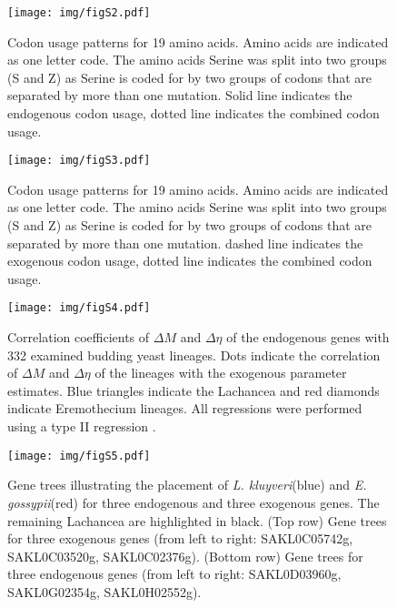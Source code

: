 \documentclass[doublespacing,linenumbers]{bmcart-modified}
\newcommand{\kluyveri}{\textit{L. kluyveri}\xspace}
\newcommand{\gossypii}{\textit{E. gossypii}\xspace}
\newcommand{\DM}{\ensuremath{{\Delta M}}\xspace}
\newcommand{\DE}{\ensuremath{{\Delta \eta}}\xspace}
\begin{document}
\begin{backmatter}
\begin{figure}
     \centering
	\texttt{[image: img/figS2.pdf]}%
	\caption{Codon usage patterns for 19 amino acids. Amino acids are indicated as one letter code. 
	The amino acids Serine was split into two groups (S and Z) as Serine is coded for by two groups of codons that are separated by more than one mutation.
	Solid line indicates the endogenous codon usage, dotted line indicates the combined codon usage.}
	\label{fig:cub_full_main}
\end{figure}
\null
\vfill
\begin{figure}
     \centering
	\texttt{[image: img/figS3.pdf]}%
	\caption{Codon usage patterns for 19 amino acids. Amino acids are indicated as one letter code. 
	The amino acids Serine was split into two groups (S and Z) as Serine is coded for by two groups of codons that are separated by more than one mutation.
	dashed line indicates the exogenous codon usage, dotted line indicates the combined codon usage.}
	\label{fig:cub_full_cleft}
\end{figure}

\null
\vfill
\begin{figure}
     \centering
	\texttt{[image: img/figS4.pdf]}%
	\caption{Correlation coefficients of \DM and \DE of the endogenous genes with 332 examined budding yeast lineages. 
	Dots indicate the correlation of \DM and \DE of the lineages with the exogenous parameter estimates.
	Blue triangles indicate the Lachancea and red diamonds indicate Eremothecium lineages.
	All regressions were performed using a type II regression \citep{SokalAndRohlf1981}.}
	\label{fig:csp_endo_comp}
\end{figure}
\null
\vfill

\null
\vfill
\begin{figure}
     \centering
	\texttt{[image: img/figS5.pdf]}%
	\caption{Gene trees illustrating the placement of \kluyveri (blue) and \gossypii (red) for three endogenous and three exogenous genes. 
	The remaining Lachancea are highlighted in black. 
	(Top row)  Gene trees for three exogenous genes (from left to right: SAKL0C05742g, SAKL0C03520g, SAKL0C02376g).
	(Bottom row) Gene trees for three endogenous genes (from left to right: SAKL0D03960g, SAKL0G02354g, SAKL0H02552g).}
	\label{fig:phylo_relation}
\end{figure}
\null
\vfill


\end{backmatter}
\end{document}

